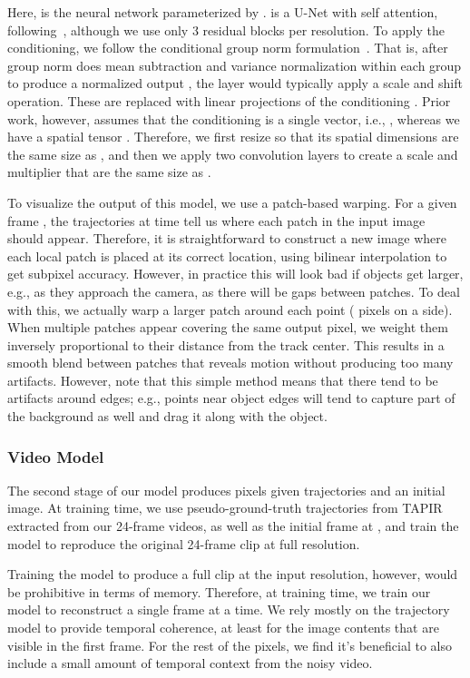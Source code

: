 \documentclass[10pt,twocolumn,letterpaper]{article}
\begin{document}
Here,  is the neural network parameterized by .   is a U-Net with self attention, following~\cite{song2020score}, although we use only 3 residual blocks per resolution.  To apply the conditioning, we follow the conditional group norm formulation~\cite{ho2020denoising,perez2018film}.  That is, after group norm does mean subtraction and variance normalization within each group to produce a normalized output , the layer would typically apply a scale and shift operation.  These are replaced with linear projections of the conditioning .  Prior work, however, assumes that the conditioning is a single vector, i.e., , whereas we have a spatial tensor .  Therefore, we first resize  so that its spatial dimensions are the same size as , and then we apply two  convolution layers to create a scale and multiplier that are the same size as .

To visualize the output of this model, we use a patch-based warping.  For a given frame , the trajectories at time  tell us where each  patch in the input image should appear.  Therefore, it is straightforward to construct a new image where each local patch is placed at its correct location, using bilinear interpolation to get subpixel accuracy.  However, in practice this will look bad if objects get larger, e.g., as they approach the camera, as there will be gaps between patches.  To deal with this, we actually warp a larger patch around each point ( pixels on a side).  When multiple patches appear covering the same output pixel, we weight them inversely proportional to their distance from the track center.  This results in a smooth blend between patches that reveals motion without producing too many artifacts.  However, note that this simple method means that there tend to be artifacts around edges; e.g., points near object edges will tend to capture part of the background as well and drag it along with the object.

\subsubsection{Video Model}
The second stage of our model produces pixels given trajectories and an initial image.  At training time, we use pseudo-ground-truth trajectories from TAPIR extracted from our 24-frame videos, as well as the initial frame at , and train the model to reproduce the original 24-frame clip at full  resolution.  

Training the model to produce a full clip at the input resolution, however, would be prohibitive in terms of memory.  Therefore, at training time, we train our model to reconstruct a single frame at a time.  We rely mostly on the trajectory model to provide temporal coherence, at least for the image contents that are visible in the first frame.  For the rest of the pixels, we find it's beneficial to also include a small amount of temporal context from the noisy video.  
\end{document}
